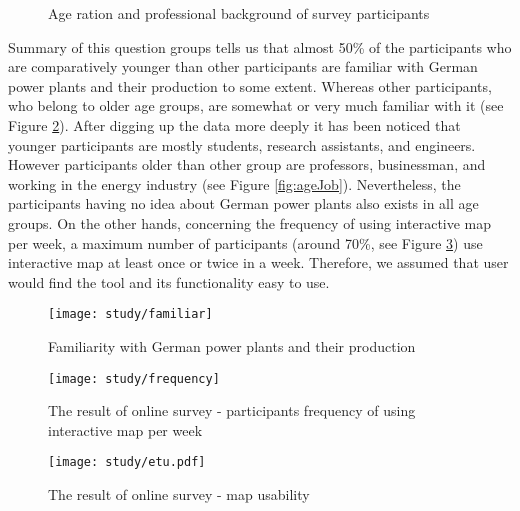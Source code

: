 \begin{figure}
  \begin{center}
\hfill
{}
\hfill
\caption{Age ration and professional background of survey participants}
\label{fig:participantBack}
\end{center}
\end{figure}

Summary of this question groups tells us that almost 50\% of the participants who are comparatively younger than other participants are familiar with German power plants and their production to some extent.  Whereas other participants, who belong to older age groups, are somewhat or very much familiar with it (see Figure \ref{fig:familiar}). After digging up the data more deeply it has been noticed that younger participants are mostly students, research assistants, and engineers. However participants older than other group are professors, businessman, and working in the energy industry (see Figure \ref{fig:ageJob}). Nevertheless, the participants having no idea about German power plants also exists in all age groups. On the other hands, concerning the frequency of using interactive map per week, a maximum number of participants (around 70\%, see Figure \ref{fig:mapUsage}) use interactive map at least once or twice in a week. Therefore, we assumed that user would find the tool and its functionality easy to use.

\begin{figure}
  \begin{center}
    \texttt{[image: study/familiar]}
    \caption{Familiarity with German power plants and their production}
    \label{fig:familiar}
  \end{center}
\end{figure}

\begin{figure} 
  \begin{center}
    \texttt{[image: study/frequency]}
    \caption[participants frequency of using interactive map per week]{The result of online survey - participants frequency of using interactive map per week}
    \label{fig:mapUsage}
  \end{center}
\end{figure}

\begin{figure}
  \begin{center}
    \texttt{[image: study/etu.pdf]}
    \caption{The result of online survey - map usability}
    \label{fig:etu}
  \end{center}
\end{figure}


